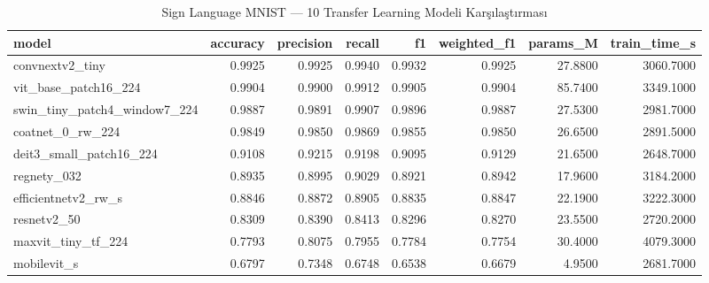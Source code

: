 \begin{table}
\caption{Sign Language MNIST — 10 Transfer Learning Modeli Karşılaştırması}
\label{tab:comparison}
\begin{tabular}{lrrrrrrr}
\toprule
model & accuracy & precision & recall & f1 & weighted_f1 & params_M & train_time_s \\
\midrule
convnextv2_tiny & 0.9925 & 0.9925 & 0.9940 & 0.9932 & 0.9925 & 27.8800 & 3060.7000 \\
vit_base_patch16_224 & 0.9904 & 0.9900 & 0.9912 & 0.9905 & 0.9904 & 85.7400 & 3349.1000 \\
swin_tiny_patch4_window7_224 & 0.9887 & 0.9891 & 0.9907 & 0.9896 & 0.9887 & 27.5300 & 2981.7000 \\
coatnet_0_rw_224 & 0.9849 & 0.9850 & 0.9869 & 0.9855 & 0.9850 & 26.6500 & 2891.5000 \\
deit3_small_patch16_224 & 0.9108 & 0.9215 & 0.9198 & 0.9095 & 0.9129 & 21.6500 & 2648.7000 \\
regnety_032 & 0.8935 & 0.8995 & 0.9029 & 0.8921 & 0.8942 & 17.9600 & 3184.2000 \\
efficientnetv2_rw_s & 0.8846 & 0.8872 & 0.8905 & 0.8835 & 0.8847 & 22.1900 & 3222.3000 \\
resnetv2_50 & 0.8309 & 0.8390 & 0.8413 & 0.8296 & 0.8270 & 23.5500 & 2720.2000 \\
maxvit_tiny_tf_224 & 0.7793 & 0.8075 & 0.7955 & 0.7784 & 0.7754 & 30.4000 & 4079.3000 \\
mobilevit_s & 0.6797 & 0.7348 & 0.6748 & 0.6538 & 0.6679 & 4.9500 & 2681.7000 \\
\bottomrule
\end{tabular}
\end{table}
